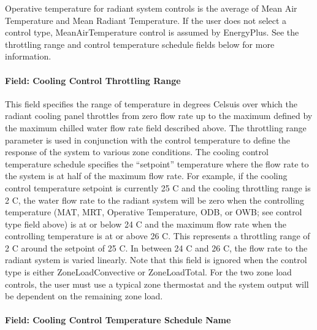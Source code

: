Operative temperature for radiant system controls is the average of Mean Air Temperature and Mean Radiant Temperature. If the user does not select a control type, MeanAirTemperature control is assumed by EnergyPlus. See the throttling range and control temperature schedule fields below for more information.

\paragraph{Field: Cooling Control Throttling Range}\label{field-cooling-control-throttling-range}

This field specifies the range of temperature in degrees Celsuis over which the radiant cooling panel throttles from zero flow rate up to the maximum defined by the maximum chilled water flow rate field described above. The throttling range parameter is used in conjunction with the control temperature to define the response of the system to various zone conditions. The cooling control temperature schedule specifies the “setpoint” temperature where the flow rate to the system is at half of the maximum flow rate. For example, if the cooling control temperature setpoint is currently 25 C and the cooling throttling range is 2 C, the water flow rate to the radiant system will be zero when the controlling temperature (MAT, MRT, Operative Temperature, ODB, or OWB; see control type field above) is at or below 24 C and the maximum flow rate when the controlling temperature is at or above 26 C. This represents a throttling range of 2 C around the setpoint of 25 C. In between 24 C and 26 C, the flow rate to the radiant system is varied linearly.  Note that this field is ignored when the control type is either ZoneLoadConvective or ZoneLoadTotal.  For the two zone load controls, the user must use a typical zone thermostat and the system output will be dependent on the remaining zone load.

\paragraph{Field: Cooling Control Temperature Schedule Name}\label{field-cooling-control-temperature-schedule-name}

